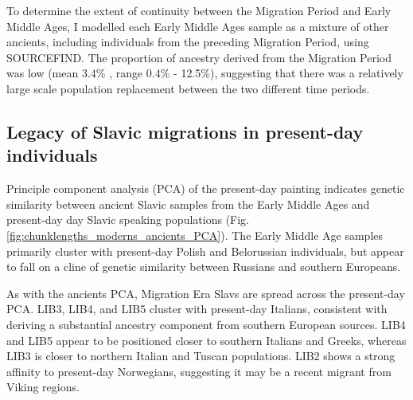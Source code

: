 To determine the extent of continuity between the Migration Period and Early Middle Ages, I modelled each Early Middle Ages sample as a mixture of other ancients, including individuals from the preceding Migration Period, using SOURCEFIND. The proportion of ancestry derived from the Migration Period was low (mean 3.4\% , range 0.4\% - 12.5\%), suggesting that there was a relatively large scale population replacement between the two different time periods. 

\subsection{Legacy of Slavic migrations in present-day individuals}

Principle component analysis (PCA) of the present-day painting indicates genetic similarity between ancient Slavic samples from the Early Middle Ages and present-day day Slavic speaking populations (Fig. \ref{fig:chunklengths_moderns_ancients_PCA}). The Early Middle Age samples primarily cluster with present-day Polish and Belorussian individuals, but appear to fall on a cline of genetic similarity between Russians and southern Europeans. 

As with the ancients PCA, Migration Era Slavs are spread across the present-day PCA. LIB3, LIB4, and LIB5 cluster with present-day Italians, consistent with deriving a substantial ancestry component from southern European sources. LIB4 and LIB5 appear to be positioned closer to southern Italians and Greeks, whereas LIB3 is closer to northern Italian and Tuscan populations. LIB2 shows a strong affinity to present-day Norwegians, suggesting it may be a recent migrant from Viking regions. 

